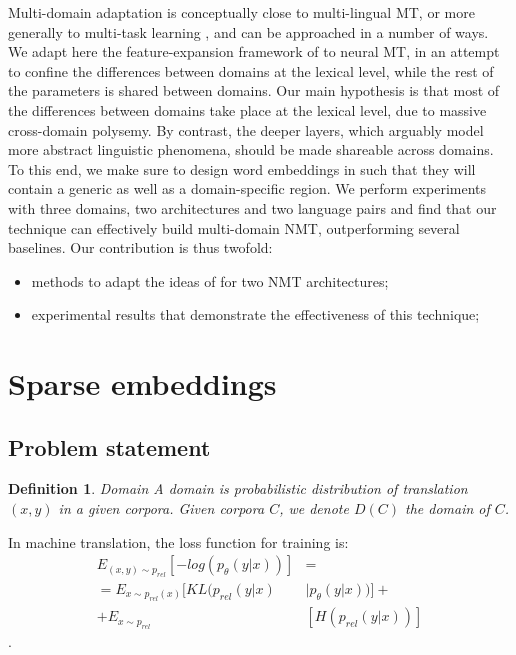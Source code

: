 \documentclass[11pt,a4paper]{article}
\newtheorem{definition}{Definition}[section]
\newcommand{\fyTodo}[1]{\Todo[FY:]{\textcolor{orange}{#1}}}
\newcommand{\fyDone}[1]{\done[FY]\Todo[FY:]{\textcolor{orange}{#1}}}
\begin{document}
Multi-domain adaptation is conceptually close to multi-lingual MT, or more generally to multi-task learning \cite{Caruana97multitask}, and can be approached in a number of ways. We adapt here the feature-expansion framework of \cite{Daume07frustratingly} to neural MT, in an attempt to confine the differences between domains at the lexical level, while the rest of the parameters is shared between domains. Our main hypothesis is that most of the differences between domains take place at the lexical level, due to massive cross-domain polysemy. By contrast, the deeper layers, which arguably model more abstract linguistic phenomena, should be made shareable across domains.
To this end, we make sure to design word embeddings in such that they will contain a generic as well as a domain-specific region. We perform experiments with three domains, two architectures and two language pairs and find that our technique can effectively build multi-domain NMT, outperforming several baselines. Our contribution is thus twofold:
\begin{itemize}
\item methods to adapt the ideas of \cite{Daume07frustratingly} for two NMT architectures;
\item experimental results that demonstrate the effectiveness of this technique;
\end{itemize}
\fyTodo{can we train in random order ? can we get away with catastrophic forgetting ?}
\fyTodo{how to analyze the embeddings ? how can we test or claim ?}

\section{Sparse embeddings \label{sec:sparse_embeddings}}
\fyDone{Use meaningful titles throughout}

\subsection{Problem statement}
\fyTodo{Use math for notation, label equations and such}
\begin{definition}{Domain}
\label{def:domain}
A domain is probabilistic distribution of translation $(x,y)$ in a given corpora. Given corpora $C$, we denote $D(C)$ the domain of $C$.
\end{definition}
\fyTodo{We need more: the source, the target, etc}
In machine translation, the loss function for training is:
\begin{equation}
\begin{split}
E_{(x,y) \sim p_{rel}}[-log(p_{\theta}(y|x))] &= \\
= E_{x \sim p_{rel}(x)}[KL(p_{rel}(y|x) & \mid p_{\theta}(y|x))] + \\
+ E_{x \sim p_{rel}} &[H(p_{rel}(y|x))]
\end{split}
\end{equation}.
\end{document}
